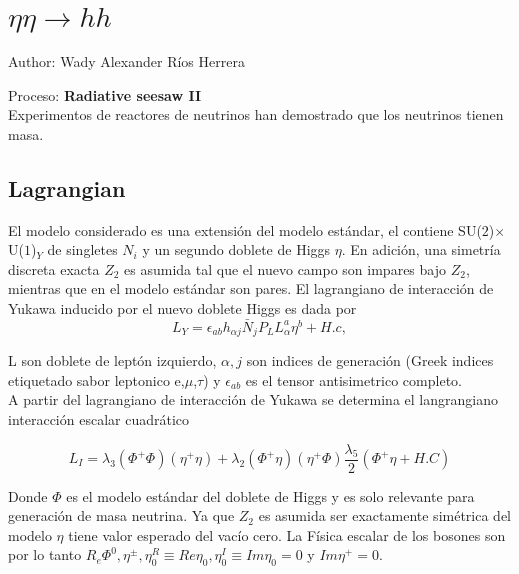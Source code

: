 
\chapter{$\eta \eta \to h h$}

Author:  Wady Alexander Ríos Herrera

Proceso: \textbf{Radiative seesaw II}\\

Experimentos de reactores  de neutrinos han demostrado que los neutrinos tienen masa.


\section{Lagrangian}


El modelo considerado es una extensión del modelo estándar, el contiene SU($2$)$\times$ U($1$)$_{Y}$ de singletes $N_{i}$ y un segundo doblete de Higgs $\eta$. En adición, una simetría discreta exacta $Z_{2}$ es asumida tal que el nuevo campo son impares bajo $Z_{2}$, mientras que en el modelo estándar son pares. El lagrangiano de interacción de  Yukawa inducido por el nuevo doblete Higgs es dada por  \cite{1}
\begin{equation}
L_{Y}=\epsilon _{ab}h_{\alpha j}\bar{N}_{j}P_{L}L_{\alpha}^{a}\eta ^{b}+H.c,
\label{1}
\end{equation}
 
L son doblete de leptón izquierdo, $\alpha , j$ son indices de generación (Greek indices etiquetado sabor leptonico e,$\mu$,$\tau$) y $\epsilon _{ab}$ es el tensor antisimetrico completo.\\

A partir del lagrangiano de interacción de Yukawa se determina el langrangiano interacción escalar cuadrático  \cite{2} 

\begin{equation}
L_{I}=\lambda_{3}(\Phi^{+}\Phi)( \eta^{+}\eta)+\lambda_{2}(\Phi^{+}\eta)( \eta^{+}\Phi) \frac{\lambda _{5}}{2}(\Phi^{+}\eta + H.C)
\label{2}
\end{equation}


Donde $\Phi$ es el modelo estándar del doblete de Higgs y es solo relevante para generación de masa neutrina. Ya que $Z_{2}$ es asumida  ser  exactamente simétrica del modelo $\eta$ tiene valor esperado del vacío cero. La Física escalar de los bosones son por lo tanto $R_{e}\Phi ^{0},\eta^{\pm},\eta_{0}^{R}\equiv Re\eta_{0}, \eta_{0}^{I}\equiv Im\eta_{0} =0 $ y $Im\eta^{+} =0$.\\



